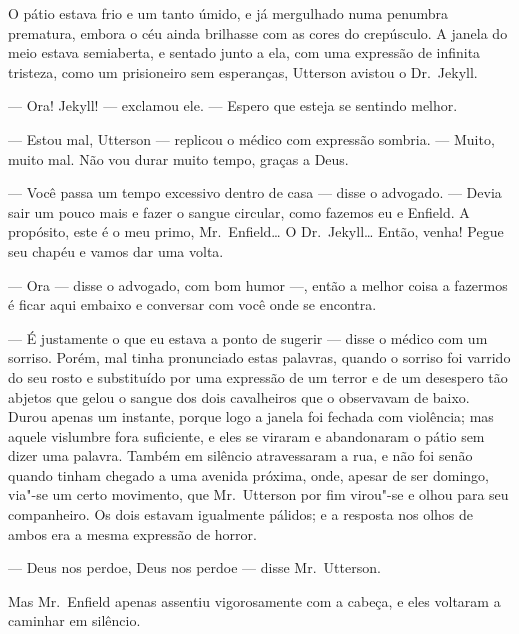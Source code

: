 O pátio estava frio e um tanto úmido, e já mergulhado numa penumbra
prematura, embora o céu ainda brilhasse com as cores do crepúsculo.  A
janela do meio estava semiaberta, e sentado junto a ela, com uma
expressão de infinita tristeza, como um prisioneiro sem esperanças,
Utterson avistou o Dr.~Jekyll.  

--- Ora!  Jekyll! --- exclamou ele.  --- Espero que esteja se sentindo
melhor.

--- Estou mal, Utterson --- replicou o médico com expressão sombria. ---
Muito, muito mal.  Não vou durar muito tempo, graças a Deus.

--- Você passa um tempo excessivo dentro de casa --- disse o advogado. ---
Devia sair um pouco mais e fazer o sangue circular, como fazemos eu e
Enfield. A propósito, este é o meu primo, Mr.~Enfield\ldots{}  O Dr.~Jekyll\ldots{} 
Então, venha!  Pegue seu chapéu e vamos dar uma volta. 


--- Ora --- disse o advogado, com bom humor ---, então a melhor coisa a
fazermos é ficar aqui embaixo e conversar com você onde se encontra.

--- É justamente o que eu estava a ponto de sugerir --- disse o médico com
um sorriso.  Porém, mal tinha pronunciado estas palavras, quando o
sorriso foi varrido do seu rosto e substituído por uma expressão de um
terror e de um desespero tão abjetos que gelou o sangue dos dois
cavalheiros que o observavam de baixo.  Durou apenas um instante,
porque logo a janela foi fechada com violência; mas aquele vislumbre
fora suficiente, e eles se viraram e abandonaram o pátio sem dizer uma
palavra.  Também em silêncio atravessaram a rua, e não foi senão quando
tinham chegado a uma avenida próxima, onde, apesar de ser domingo, via"-se
um certo movimento, que Mr.~Utterson por fim virou"-se e olhou para seu
companheiro.  Os dois estavam igualmente pálidos; e a resposta nos
olhos de ambos era a mesma expressão de horror.

--- Deus nos perdoe, Deus nos perdoe --- disse Mr.~Utterson.

Mas Mr.~Enfield apenas assentiu vigorosamente com a cabeça, e eles
voltaram a caminhar em silêncio.


